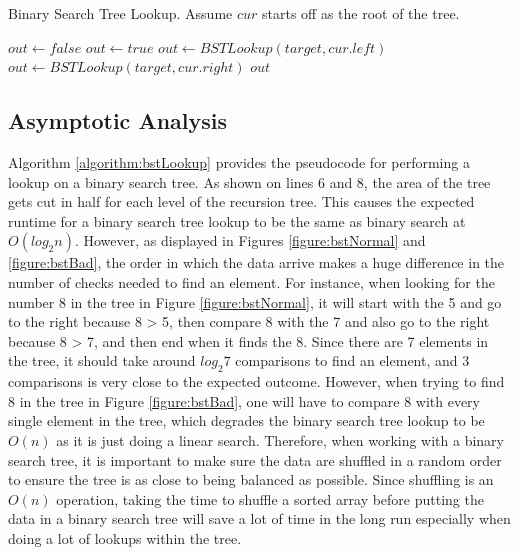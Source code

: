 \documentclass[letterpaper, 10pt,DIV=13]{scrartcl}
\numberwithin{equation}{section} %
\numberwithin{figure}{section} %
\numberwithin{table}{section} %
\begin{document}
\begin{algorithm}
  \caption{Binary Search Tree Lookup. Assume $cur$ starts off as the root of the tree.}
  \label{algorithm:bstLookup}
  \begin{algorithmic}[1]
      \State $out \gets false$ 
        \State $out \gets true$ 
        \State $out \gets BSTLookup(target, cur.left)$ 
      \Else {}
        \State $out \gets BSTLookup(target, cur.right)$ 
      \EndIf
      \State \Return $out$
    \EndProcedure
  \end{algorithmic}
\end{algorithm}

\subsection{Asymptotic Analysis}\label{bstAnalysis}
Algorithm \ref{algorithm:bstLookup} provides the pseudocode for performing a lookup on a binary search tree. As shown on lines 6 and 8, the area of the tree gets cut in half for each level of the recursion tree. This causes the expected runtime for a binary search tree lookup to be the same as binary search at $O(log_2n)$. However, as displayed in Figures \ref{figure:bstNormal} and \ref{figure:bstBad}, the order in which the data arrive makes a huge difference in the number of checks needed to find an element. For instance, when looking for the number 8 in the tree in Figure \ref{figure:bstNormal}, it will start with the 5 and go to the right because 8 > 5, then compare 8 with the 7 and also go to the right because 8 > 7, and then end when it finds the 8. Since there are 7 elements in the tree, it should take around $log_{2}7$ comparisons to find an element, and 3 comparisons is very close to the expected outcome. However, when trying to find 8 in the tree in Figure \ref{figure:bstBad}, one will have to compare 8 with every single element in the tree, which degrades the binary search tree lookup to be $O(n)$ as it is just doing a linear search. Therefore, when working with a binary search tree, it is important to make sure the data are shuffled in a random order to ensure the tree is as close to being balanced as possible. Since shuffling is an $O(n)$ operation, taking the time to shuffle a sorted array before putting the data in a binary search tree will save a lot of time in the long run especially when doing a lot of lookups within the tree.
\end{document}
